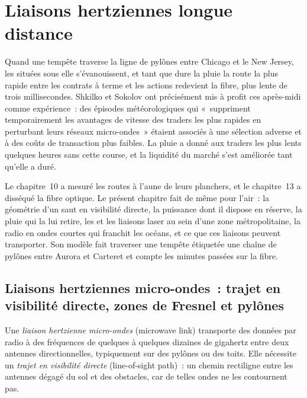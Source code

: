 \chapter{Liaisons hertziennes longue distance}\label{ch:nw:long-haul-wireless}

Quand une tempête traverse la ligne de pylônes entre Chicago et le New Jersey, les  situées sous elle s'évanouissent, et tant que dure la pluie
la route la plus rapide entre les contrats à terme et les actions redevient la fibre, plus lente de trois millisecondes. Shkilko et Sokolov ont précisément
mis à profit ces après-midi comme expérience~: des épisodes météorologiques qui «~suppriment temporairement les avantages de vitesse des traders les plus rapides en perturbant
leurs réseaux micro-ondes~» étaient associés à une sélection adverse et à des coûts de transaction plus faibles. La pluie a donné aux traders les plus lents quelques
heures sans cette course, et la liquidité du marché s'est améliorée tant qu'elle a duré.

Le chapitre~10 a mesuré les routes à l'aune de leurs planchers, et le chapitre~13 a disséqué la fibre optique. Le présent chapitre fait de même pour l'air~: la géométrie
d'un saut en visibilité directe, la puissance dont il dispose en réserve, la pluie qui la lui retire, les  et les liaisons laser au sein d'une
zone métropolitaine, la radio en ondes courtes qui franchit les océans, et ce que ces liaisons peuvent transporter. Son modèle fait traverser une tempête étiquetée une chaîne de pylônes
entre Aurora et Carteret et compte les minutes passées sur la fibre.

\section{Liaisons hertziennes micro-ondes~: trajet en visibilité directe, zones de Fresnel et pylônes}

\begin{definition}\label{def:nw:long-haul-wireless:mw}
Une \emph{liaison hertzienne micro-ondes} (microwave link) transporte des données par radio à des fréquences de quelques à quelques dizaines de gigahertz entre deux
antennes directionnelles, typiquement sur des pylônes ou des toits. Elle nécessite un \emph{trajet en visibilité directe} (line-of-sight path)~: un chemin rectiligne entre les antennes
dégagé du sol et des obstacles, car de telles ondes ne les contournent pas.
\end{definition}


